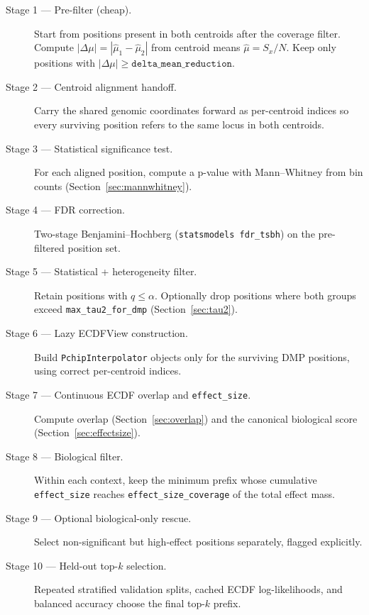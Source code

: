 \documentclass[11pt]{article}
\begin{document}
\begin{description}
  \item[Stage 1 --- Pre-filter (cheap).]
        Start from positions present in both centroids after the coverage
        filter. Compute \(|\Delta\mu| = |\hat\mu_1 - \hat\mu_2|\) from centroid
        means \(\hat\mu = S_x/N\). Keep only positions with
        \(|\Delta\mu| \geq \texttt{delta\_mean\_reduction}\).

  \item[Stage 2 --- Centroid alignment handoff.]
        Carry the shared genomic coordinates forward as per-centroid indices
        so every surviving position refers to the same locus in both
        centroids.

  \item[Stage 3 --- Statistical significance test.]
        For each aligned position, compute a p-value with Mann--Whitney from
        bin counts (Section~\ref{sec:mannwhitney}).

  \item[Stage 4 --- FDR correction.]
        Two-stage Benjamini--Hochberg (\texttt{statsmodels fdr\_tsbh}) on the
        pre-filtered position set.

  \item[Stage 5 --- Statistical + heterogeneity filter.]
        Retain positions with \(q \leq \alpha\).  Optionally drop positions
        where both groups exceed \texttt{max\_tau2\_for\_dmp}
        (Section~\ref{sec:tau2}).

  \item[Stage 6 --- Lazy ECDFView construction.]
        Build \texttt{PchipInterpolator} objects only for the surviving DMP
        positions, using correct per-centroid indices.

  \item[Stage 7 --- Continuous ECDF overlap and \texttt{effect\_size}.]
        Compute overlap (Section~\ref{sec:overlap}) and the canonical
        biological score (Section~\ref{sec:effectsize}).

  \item[Stage 8 --- Biological filter.]
        Within each context, keep the minimum prefix whose cumulative
        \texttt{effect\_size} reaches \texttt{effect\_size\_coverage} of the
        total effect mass.

  \item[Stage 9 --- Optional biological-only rescue.]
        Select non-significant but high-effect positions separately, flagged
        explicitly.

  \item[Stage 10 --- Held-out top-$k$ selection.]
        Repeated stratified validation splits, cached ECDF log-likelihoods,
        and balanced accuracy choose the final top-$k$ prefix.
\end{description}
\end{document}
